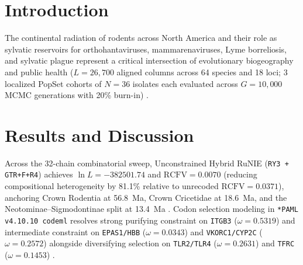 \documentclass[10pt,letterpaper]{article}
\begin{document}
\section{Introduction}
The continental radiation of rodents across North America and their role as sylvatic reservoirs for orthohantaviruses, mammarenaviruses, Lyme borreliosis, and sylvatic plague represent a critical intersection of evolutionary biogeography and public health ($L = 26,700$ aligned columns across 64 species and 18 loci; 3 localized PopSet cohorts of $N = 36$ isolates each evaluated across $G = 10,000$ MCMC generations with 20\% burn-in) \cite{White2026RuNIE,Fabre2012,Steppan2017,Hjelle2010,Gage2005,Ostfeld2006}.

\section{Results and Discussion}
Across the 32-chain combinatorial sweep, Unconstrained Hybrid RuNIE (\texttt{RY3 + GTR+F+R4}) achieves $\ln L = -382501.74$ and $\text{RCFV} = 0.0070$ (reducing compositional heterogeneity by 81.1\% relative to unrecoded $\text{RCFV} = 0.0371$), anchoring Crown Rodentia at 56.8~Ma, Crown Cricetidae at 18.6~Ma, and the Neotominae--Sigmodontinae split at 13.4~Ma \cite{Katoh2013,Minh2020,To2016}. Codon selection modeling in \texttt{*PAML v4.10.10 codeml} \cite{Yang2007} resolves strong purifying constraint on \texttt{ITGB3} ($\omega = 0.5319$) \cite{Gavrilovskaya1998} and intermediate constraint on \texttt{EPAS1/HBB} ($\omega = 0.0343$) \cite{Storz2009,Schweizer2019} and \texttt{VKORC1/CYP2C} ($\omega = 0.2572$) \cite{Pelz2005,Song2011} alongside diversifying selection on \texttt{TLR2/TLR4} ($\omega = 0.2631$) \cite{Tschirren2013} and \texttt{TFRC} ($\omega = 0.1453$) \cite{Abraham2009,Demogines2013,Drummond2005}.
\end{document}
